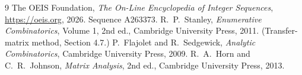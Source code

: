 \documentclass[11pt,a4paper]{article}
\theoremstyle{plain}
\theoremstyle{definition}
\begin{document}
\begin{thebibliography}{9}
 The OEIS Foundation, \emph{The On-Line Encyclopedia of Integer
Sequences}, \url{https://oeis.org}, 2026. Sequence A263373.
 R.~P.~Stanley, \emph{Enumerative Combinatorics}, Volume 1, 2nd ed.,
Cambridge University Press, 2011. (Transfer-matrix method, Section 4.7.)
 P.~Flajolet and R.~Sedgewick, \emph{Analytic Combinatorics}, Cambridge
University Press, 2009.
 R.~A.~Horn and C.~R.~Johnson, \emph{Matrix Analysis}, 2nd ed., Cambridge
University Press, 2013.
\end{thebibliography}
\end{document}
